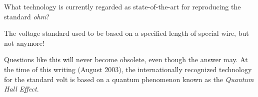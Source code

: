 

What technology is currently regarded as state-of-the-art for reproducing the standard {\it ohm}?







The voltage standard used to be based on a specified length of special wire, but not anymore!







Questions like this will never become obsolete, even though the answer may.  At the time of this writing (August 2003), the internationally recognized technology for the standard volt is based on a quantum phenomenon known as the {\it Quantum Hall Effect}.





